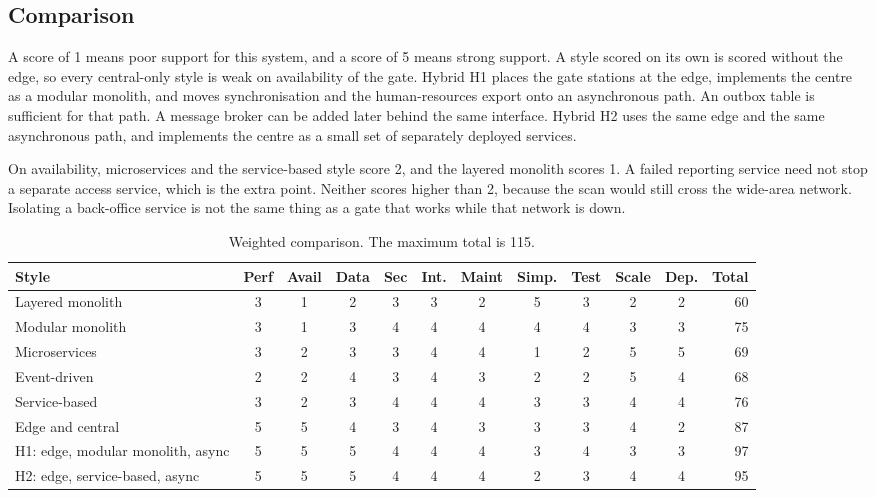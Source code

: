 \subsection{Comparison}

A score of 1 means poor support for this system, and a score of 5 means strong support.
A style scored on its own is scored without the edge, so every central-only style is weak on availability of the gate.
Hybrid H1 places the gate stations at the edge, implements the centre as a modular monolith, and moves synchronisation and the human-resources export onto an asynchronous path.
An outbox table is sufficient for that path.
A message broker can be added later behind the same interface.
Hybrid H2 uses the same edge and the same asynchronous path, and implements the centre as a small set of separately deployed services.

On availability, microservices and the service-based style score 2, and the layered monolith scores 1.
A failed reporting service need not stop a separate access service, which is the extra point.
Neither scores higher than 2, because the scan would still cross the wide-area network.
Isolating a back-office service is not the same thing as a gate that works while that network is down.

\begin{table}[ht]
\centering
\caption{Weighted comparison. The maximum total is 115.}
\label{tab:scores}
\scriptsize
\setlength{\tabcolsep}{3.5pt}
\begin{tabular}{@{}lccccccccccr@{}}
\toprule
\textbf{Style} & \textbf{Perf} & \textbf{Avail} & \textbf{Data} & \textbf{Sec} & \textbf{Int.} & \textbf{Maint} & \textbf{Simp.} & \textbf{Test} & \textbf{Scale} & \textbf{Dep.} & \textbf{Total}\\
\midrule
Layered monolith & 3 & 1 & 2 & 3 & 3 & 2 & 5 & 3 & 2 & 2 & 60\\
Modular monolith & 3 & 1 & 3 & 4 & 4 & 4 & 4 & 4 & 3 & 3 & 75\\
Microservices & 3 & 2 & 3 & 3 & 4 & 4 & 1 & 2 & 5 & 5 & 69\\
Event-driven & 2 & 2 & 4 & 3 & 4 & 3 & 2 & 2 & 5 & 4 & 68\\
Service-based & 3 & 2 & 3 & 4 & 4 & 4 & 3 & 3 & 4 & 4 & 76\\
Edge and central & 5 & 5 & 4 & 3 & 4 & 3 & 3 & 3 & 4 & 2 & 87\\
H1: edge, modular monolith, async & 5 & 5 & 5 & 4 & 4 & 4 & 3 & 4 & 3 & 3 & 97\\
H2: edge, service-based, async & 5 & 5 & 5 & 4 & 4 & 4 & 2 & 3 & 4 & 4 & 95\\
\bottomrule
\end{tabular}
\end{table}

